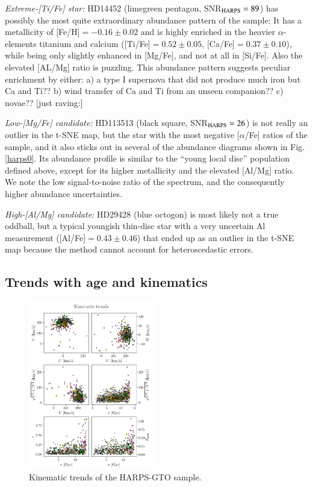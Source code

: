\documentclass{aa}  %
\begin{document}
{\it Extreme-[Ti/Fe] star:} HD14452 (limegreen pentagon, SNR$_{\rm HARPS}=89$) has possibly the most quite extraordinary abundance pattern of the \citet{DelgadoMena2017} sample: It has a metallicity of [Fe/H]$=-0.16\pm0.02$ and is highly enriched in the heavier $\alpha$-elements titanium and calcium ([Ti/Fe]$=0.52\pm0.05$, [Ca/Fe]$=0.37\pm0.10$), while being only slightly enhanced in [Mg/Fe], and not at all in [Si/Fe]. Also the elevated [AL/Mg] ratio is puzzling. This abundance pattern suggests peculiar enrichment by either:
a) a type I supernova that did not produce much iron but Ca and Ti??
b) wind transfer of Ca and Ti from an unseen companion?? 
c) novae??
[just raving:]

{\it Low-[Mg/Fe] candidate:} HD113513 (black square, SNR$_{\rm HARPS}=26$) is not really an outlier in the t-SNE map, but the star with the most negative [$\alpha$/Fe] ratios of the sample, and it also sticks out in several of the abundance diagrams shown in Fig. \ref{harps0}. Its abundance profile is similar to the ``young local disc'' population defined above, except for its higher metallicity and the elevated [Al/Mg] ratio. We note the low signal-to-noise ratio of the spectrum, and the consequently higher abundance uncertainties.%

{\it High-[Al/Mg] candidate:} HD29428 (blue octogon) is most likely not a true oddball, but a typical youngish thin-disc star with a very uncertain Al measurement ([Al/Fe]$=0.43\pm0.46$) that ended up as an outlier in the t-SNE map because the method cannot account for heteroscedastic errors.

\subsection{Trends with age and kinematics}

\begin{figure}\centering
 \includegraphics[width=0.49\textwidth]{im/harps_tsne-kin-abundsplot_teffcut.png}
\caption{Kinematic trends of the HARPS-GTO sample.}
\label{kin}
\end{figure}
\end{document}
